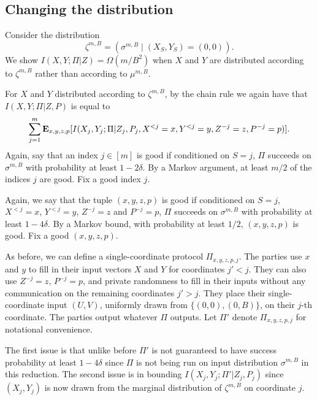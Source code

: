 \documentclass[twoside,leqno,twocolumn]{article}
\begin{document}
\subsection{Changing the distribution}\label{sec:change} Consider the
distribution $$\zeta^{m,B} = (\sigma^{m,B} \mid (X_S, Y_S) =
(0,0)).$$ We show $I(X, Y ; \Pi | Z) = \Omega(m/B^2)$ when $X$ and $Y$
are distributed according to $\zeta^{m,B}$ rather than according to
$\mu^{m,B}$.

For $X$ and $Y$ distributed according to $\zeta^{m,B}$, by the chain rule we again have
that $I(X, Y ; \Pi | Z, P)$ is equal to 
\begin{eqnarray*}
\sum_{j=1}^m {\bf E}_{x, y, z, p} [I(X_j, Y_j ; \Pi |
Z_j, P_j, X^{<j} = x, Y^{<j} = y, Z^{-j} = z, P^{-j} = p)].
\end{eqnarray*}
Again, say that an index $j \in [m]$ is good if conditioned on $S=j$,
$\Pi$ succeeds on $\sigma^{m,B}$ with probability at least $1-2\delta$.
By a Markov argument, at least $m/2$ of the indices $j$ are good. 
Fix a good index $j$. 

Again, we say that the tuple $(x, y, z, p)$ is good if conditioned on $S = j$,
$X^{<j} = x$, $Y^{<j} = y$, $Z^{-j} = z$ and $P^{-j} = p$, $\Pi$ succeeds on $\sigma^{m,B}$
with probability at least $1-4\delta$. By a Markov bound, with probability
at least $1/2$, $(x, y, z, p)$ is good. Fix a good $(x,y,z,p)$.

As before, we can define a single-coordinate protocol $\Pi_{x,y,z,p,j}$. 
The parties use $x$ and $y$ to fill in their input
vectors $X$ and $Y$ for coordinates $j' < j$. They can also use 
$Z^{-j} = z$, $P^{-j} =p$, and private randomness to fill in their inputs without any
communication on the remaining coordinates $j' > j$. They place their
single-coordinate input $(U, V)$, uniformly drawn from $\{(0,0), (0,B)\}$,
on their $j$-th coordinate. The parties output whatever $\Pi$ outputs. Let $\Pi'$
denote $\Pi_{x,y,z,p,j}$ for notational convenience.

The first issue is that unlike before $\Pi'$ is not guaranteed to have success probability
at least $1-4\delta$ since $\Pi$ is not being run on input distribution $\sigma^{m,B}$
in this reduction. The second issue is in bounding $I(X_j, Y_j ; \Pi' | Z_j,P_j)$ since 
$(X_j, Y_j)$ is now drawn from the marginal distribution of $\zeta^{m,B}$ on coordinate $j$. 
\end{document}
